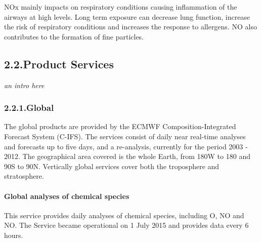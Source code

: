 \documentclass[9pt]{report}
\begin{document}
NOx mainly impacts on respiratory conditions causing inflammation of the airways at high levels. Long term exposure can decrease lung function, increase the risk of respiratory conditions and increases the response to allergens. 
NO also contributes to the formation of fine particles.%

\subsection{2.2.\hspace*{0.5em}Product Services}\label{sec-product-services}%

\noindent{}\emph{an intro here}%

\subsubsection{2.2.1.\hspace*{0.5em}Global}\label{sec-global}%

\noindent{}The global products are provided by the ECMWF Composition-Integrated Forecast System (C-IFS).
The services consist of daily near real-time analyses and forecasts up to five days, and a re-analysis, currently for the period 2003 - 2012. 
The geographical area covered is the whole Earth, from 180\textdegree{}W to 180\textdegree{} and 90\textdegree{}S to 90\textdegree{}N. 
Vertically global services cover both the troposphere and stratosphere.%

\paragraph{Global analyses of chemical species}\label{sec-global-analyses-of-chemical-species}%

\noindent{}This service provides daily analyses of chemical species, including O, NO and NO. 
The Service became operational on 1 July 2015 and provides data every 6 hours.%
\end{document}
